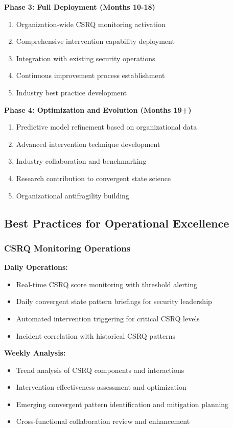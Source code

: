 \documentclass[11pt,a4paper]{article}
\begin{document}
\textbf{Phase 3: Full Deployment (Months 10-18)}
\begin{enumerate}
\item Organization-wide CSRQ monitoring activation
\item Comprehensive intervention capability deployment
\item Integration with existing security operations
\item Continuous improvement process establishment
\item Industry best practice development
\end{enumerate}

\textbf{Phase 4: Optimization and Evolution (Months 19+)}
\begin{enumerate}
\item Predictive model refinement based on organizational data
\item Advanced intervention technique development
\item Industry collaboration and benchmarking
\item Research contribution to convergent state science
\item Organizational antifragility building
\end{enumerate}

\subsection{Best Practices for Operational Excellence}

\subsubsection{CSRQ Monitoring Operations}

\textbf{Daily Operations:}
\begin{itemize}
\item Real-time CSRQ score monitoring with threshold alerting
\item Daily convergent state pattern briefings for security leadership
\item Automated intervention triggering for critical CSRQ levels
\item Incident correlation with historical CSRQ patterns
\end{itemize}

\textbf{Weekly Analysis:}
\begin{itemize}
\item Trend analysis of CSRQ components and interactions
\item Intervention effectiveness assessment and optimization
\item Emerging convergent pattern identification and mitigation planning
\item Cross-functional collaboration review and enhancement
\end{itemize}
\end{document}
